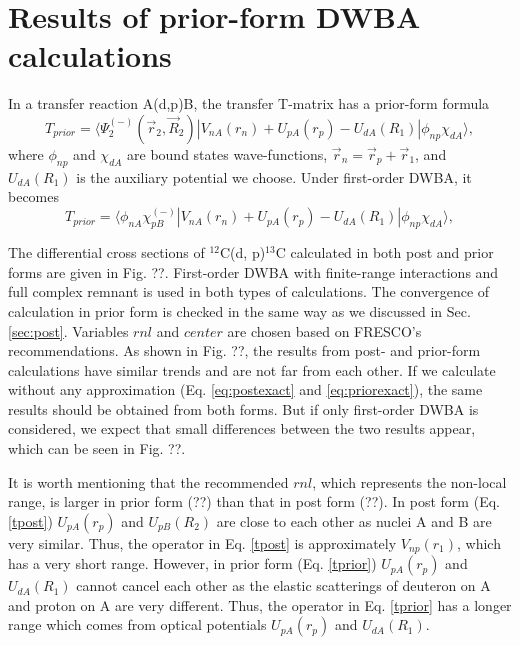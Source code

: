 \section{Results of prior-form DWBA calculations}
In a transfer reaction A(d,p)B, the transfer T-matrix has a prior-form formula \cite{thompson2009nuclear}
\begin{equation}\label{eq:priorexact}
T_{prior}=\langle\Psi_2^{(-)}(\vec{r}_2,\vec{R}_2)\left|V_{nA}(r_n)+U_{pA}(r_p)-U_{dA}(R_1)\right|\phi_{np}\chi_{dA}\rangle,
\end{equation}
where $\phi_{np}$ and $\chi_{dA}$ are bound states wave-functions, $\vec{r}_n=\vec{r}_p+\vec{r}_1$, 
and $U_{dA}(R_1)$ is the auxiliary potential we choose. 
Under first-order DWBA, it becomes
\begin{equation}\label{tprior}
T_{prior}=\langle\phi_{nA}\chi_{pB}^{(-)}\left|V_{nA}(r_n)+U_{pA}(r_p)-U_{dA}(R_1)\right|\phi_{np}\chi_{dA}\rangle,
\end{equation}
\par
The differential cross sections of $^{12}$C(d, p)$^{13}$C calculated in both post and prior forms are given in Fig. ??. 
First-order DWBA with finite-range interactions and full complex remnant is used in both types of calculations. 
The convergence of calculation in prior form is checked in the same way as we discussed in Sec. \ref{sec:post}. 
Variables $rnl$ and $center$ are chosen based on FRESCO's recommendations. 
As shown in Fig. ??, the results from post- and prior-form calculations have similar trends and are not far from each other. 
If we calculate without any approximation (Eq. \ref{eq:postexact} and \ref{eq:priorexact}), 
the same results should be obtained from both forms. 
But if only first-order DWBA is considered, we expect that small differences between the two results appear, 
which can be seen in Fig. ??. 
\par
It is worth mentioning that the recommended $rnl$, which represents the non-local range, is larger in prior form (??) than that in post form (??). 
In post form (Eq. \ref{tpost}) $U_{pA}(r_p)$ and $U_{pB}(R_2)$ are close to each other as nuclei A and B are very similar. 
Thus, the operator in Eq. \ref{tpost} is approximately $V_{np}(r_1)$, which has a very short range. 
However, in prior form (Eq. \ref{tprior}) $U_{pA}(r_p)$ and $U_{dA}(R_1)$ cannot cancel each other as the elastic scatterings of deuteron on A and proton on A are very different. 
Thus, the operator in Eq. \ref{tprior} has a longer range which comes from optical potentials $U_{pA}(r_p)$ and $U_{dA}(R_1)$. 